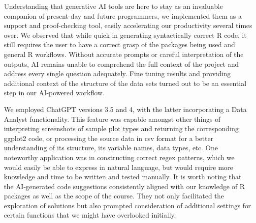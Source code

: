 \documentclass[
]{article}
\begin{document}
Understanding that generative AI tools are here to stay as an invaluable
companion of present-day and future programmers, we implemented them as
a support and proof-checking tool, easily accelerating our productivity
several times over. We observed that while quick in generating
syntactically correct R code, it still requires the user to have a
correct grasp of the packages being used and general R workflows.
Without accurate prompts or careful interpretation of the outputs, AI
remains unable to comprehend the full context of the project and address
every single question adequately. Fine tuning results and providing
additional context of the structure of the data sets turned out to be an
essential step in our AI-powered workflow.

We employed ChatGPT versions 3.5 and 4, with the latter incorporating a
Data Analyst functionality. This feature was capable amongst other
things of interpreting screenshots of sample plot types and returning
the corresponding ggplot2 code, or processing the source data in csv
format for a better understanding of its structure, its variable names,
data types, etc. One noteworthy application was in constructing correct
regex patterns, which we would easily be able to express in natural
language, but would require more knowledge and time to be written and
tested manually. It is worth noting that the AI-generated code
suggestions consistently aligned with our knowledge of R packages as
well as the scope of the course. They not only facilitated the
exploration of solutions but also prompted consideration of additional
settings for certain functions that we might have overlooked initially.
\end{document}
